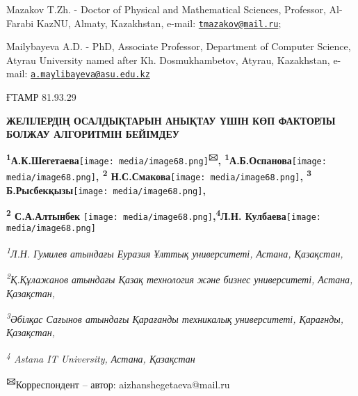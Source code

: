 \documentclass[
]{article}
\begin{document}
Mazakov T.Zh. - Doctor of Physical and Mathematical Sciences, Professor,
Al-Farabi KazNU, Almaty, Kazakhstan, e-mail:
\href{mailto:tmazakov@mail.ru}{\nolinkurl{tmazakov@mail.ru}};

Mailybayeva A.D. - PhD, Associate Professor, Department of Computer
Science, Atyrau University named after Kh. Dosmukhambetov, Atyrau,
Kazakhstan, e-mail:
\href{mailto:a.maylibayeva@asu.edu.kz}{\nolinkurl{a.maylibayeva@asu.edu.kz}}

ҒТАМР 81.93.29

\textbf{ЖЕЛІЛЕРДІҢ ОСАЛДЫҚТАРЫН АНЫҚТАУ ҮШІН КӨП ФАКТОРЛЫ БОЛЖАУ
АЛГОРИТМІН БЕЙІМДЕУ}

\textbf{\textsuperscript{1}А.К.Шегетаева}\texttt{[image: media/image68.png]}\textbf{\textsuperscript{🖂},
\textsuperscript{1}А.Б.Оспанова}\texttt{[image: media/image68.png]}\textbf{,
\textsuperscript{2}
Н.С.Смакова}\texttt{[image: media/image68.png]}\textbf{,
\textsuperscript{3}
Б.Рысбекқызы}\texttt{[image: media/image68.png]}\textbf{,}

\textbf{\textsuperscript{2} С.А.Алтынбек}
\texttt{[image: media/image68.png]}\textbf{,\textsuperscript{4}Л.Н.
Кулбаева}\texttt{[image: media/image68.png]}

\emph{\textsuperscript{1}Л.Н. Гумилев атындағы Еуразия Ұлттық
университеті, Астана, Қазақстан,}

\emph{\textsuperscript{2}Қ.Құлажанов атындағы Қазақ технология және
бизнес университеті, Астана, Қазақстан,}

\emph{\textsuperscript{3}Әбілқас Сағынов атындағы Қарағанды техникалық
университеті, Қарағнды, Қазақстан,}

\emph{\textsuperscript{4} Astana IT University, Астана, Қазақстан}

\textbf{\textsuperscript{🖂}}Корреспондент -- автор:
aizhanshegetaeva@mail.ru
\end{document}
